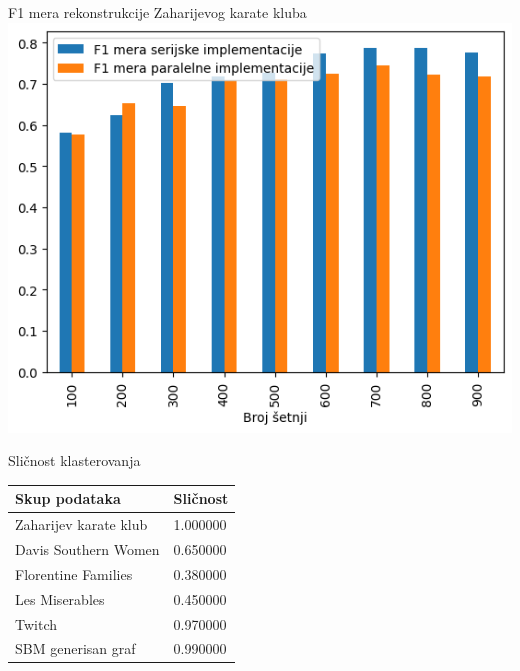 \documentclass{beamer}
\begin{document}
\begin{frame}{F1 mera rekonstrukcije Zaharijevog karate kluba}
    \centering 
    \includegraphics[height=0.8\textheight]{./csv/4.4.png}
\end{frame}

\begin{frame}{Sličnost klasterovanja}
    \centering
    \begin{table}
        \label{tab:4.11}
        \begin{tabular}{p{1in}p{1in}}
        \hline
        Skup podataka & Sličnost \\
        \hline
        Zaharijev karate klub & 1.000000 \\
        Davis Southern Women & 0.650000 \\
        Florentine Families & 0.380000 \\
        Les Miserables & 0.450000 \\
        Twitch & 0.970000 \\
        SBM generisan graf & 0.990000 \\
        \hline
    \end{tabular}
    \end{table}
\end{frame}
\end{document}
